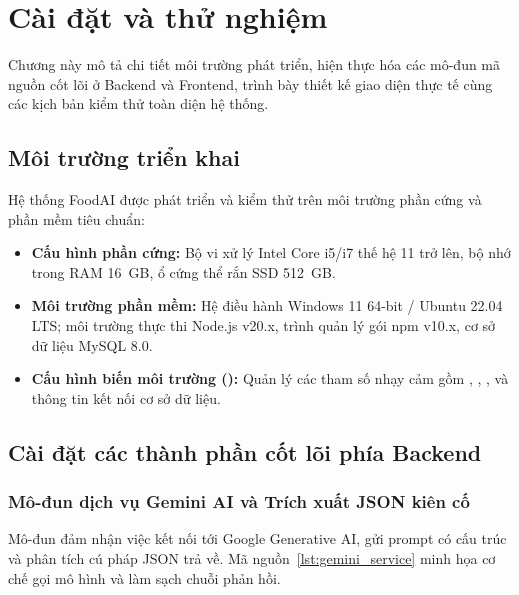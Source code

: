 \chapter{Cài đặt và thử nghiệm}
\label{ch:caidat}

\begin{muctieu}
Chương này mô tả chi tiết môi trường phát triển, hiện thực hóa các mô-đun mã nguồn cốt lõi ở Backend và Frontend, trình bày thiết kế giao diện thực tế cùng các kịch bản kiểm thử toàn diện hệ thống.
\end{muctieu}

\section{Môi trường triển khai}

Hệ thống FoodAI được phát triển và kiểm thử trên môi trường phần cứng và phần mềm tiêu chuẩn:
\begin{itemize}[leftmargin=1.6em, itemsep=2pt]
  \item \textbf{Cấu hình phần cứng:} Bộ vi xử lý Intel Core i5/i7 thế hệ 11 trở lên, bộ nhớ trong RAM 16~GB, ổ cứng thể rắn SSD 512~GB.
  \item \textbf{Môi trường phần mềm:} Hệ điều hành Windows 11 64-bit / Ubuntu 22.04 LTS; môi trường thực thi Node.js v20.x, trình quản lý gói npm v10.x, cơ sở dữ liệu MySQL 8.0.
  \item \textbf{Cấu hình biến môi trường ():} Quản lý các tham số nhạy cảm gồm , , ,  và thông tin kết nối cơ sở dữ liệu.
\end{itemize}

\section{Cài đặt các thành phần cốt lõi phía Backend}

\subsection{Mô-đun dịch vụ Gemini AI và Trích xuất JSON kiên cố}

Mô-đun  đảm nhận việc kết nối tới Google Generative AI, gửi prompt có cấu trúc và phân tích cú pháp JSON trả về. Mã nguồn~\ref{lst:gemini_service} minh họa cơ chế gọi mô hình và làm sạch chuỗi phản hồi.

